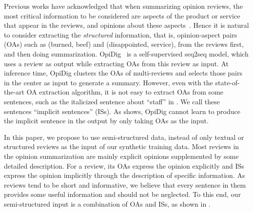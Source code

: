 Previous works have acknowledged that when summarizing opinion reviews, the most critical information
to be considered are aspects of the product or service that appear in the reviews,
and opinions about these aspects~\cite{AngelidisL18,MukherjeePVGBG20}.
Hence it is natural to consider extracting the {\em structured} information, 
that is, opinion-aspect pairs (OAs) such as (burned, beef) and (disappointed, service),
from the reviews first, and then doing summarization.
OpiDig~\cite{OpiDig20} is a self-supervised seq2seq model, which uses a review as output 
while extracting OAs from this review as input.
At inference time, OpiDig clusters the OAs 
of multi-reviews and selects those pairs in the center as input to 
generate a summary. 
However, even with the state-of-the-art OA extraction algorithm,%
it is not easy to extract OAs from some sentences, such as the italicized sentence 
about ``staff'' in . 
We call these sentences ``implicit sentences'' (ISs).
As  shows, OpiDig cannot learn to produce the implicit sentence in the output 
by only taking OAs as the input.


In this paper, we propose to use semi-structured data, 
instead of only textual or structured reviews as the input of our synthetic training data. 
Most reviews in the opinion summarization are mainly explicit opinions supplemented by some detailed description.
For a review, its OAs express the opinion explicitly
and ISs express the opinion implicitly through the description of specific information.
As reviews tend to be short and informative,
we believe that every sentence in them provides some useful information and should not be neglected.
To this end, our semi-structured input is a combination of OAs and ISs, as shown in .

